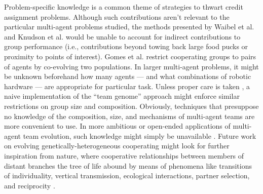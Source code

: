 Problem-specific knowledge is a common theme of strategies to thwart credit assignment problems.
Although such contributions aren't relevant to the particular multi-agent problems studied, the methods presented by Waibel et al. and Knudson et al. would be unable to account for indirect contributions to group performance (i.e., contributions beyond towing back large food pucks or proximity to points of interest).
Gomes et al. restrict cooperating groups to pairs of agents by co-evolving two populations.
In larger multi-agent problems, it might be unknown beforehand how many agents --- and what combinations of robotic hardware --- are appropriate for particular task.
Unless proper care is taken \cite{bongard2000legion}, a naive implementation of the ``team genome'' approach might enforce similar restrictions on group size and composition.
Obviously, techniques that presuppose no knowledge of the composition, size, and mechanisms of multi-agent teams are more convenient to use.
In more ambitious or open-ended applications of multi-agent team evolution, such knowledge might simply be unavailable \cite{kernbach2008symbiotic,baele2009open}.
Future work on evolving genetically-heterogeneous cooperating might look for further inspiration from nature, where cooperative relationships between members of distant branches the tree of life abound by means of phenomena like transitions of individuality, vertical transmission, ecological interactions, partner selection, and reciprocity \cite{vostinar2017suicide, andre2016evolutionary}.

